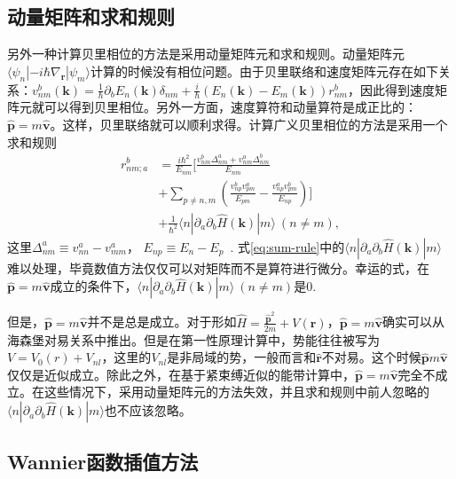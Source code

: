 \subsection{动量矩阵和求和规则}

另外一种计算贝里相位的方法是采用动量矩阵元和求和规则\cite{sipe_second-order_2000}。动量矩阵元$\langle\psi_{n}|-i\hbar\nabla_{\mathbf{r}}|\psi_{m}\rangle$计算的时候没有相位问题。由于贝里联络和速度矩阵元存在如下关系：$v_{nm}^{b}(\mathbf{k})=\frac{1}{\hbar}\partial_{b}E_{n}(\mathbf{k})\delta_{nm}+\frac{i}{\hbar}(E_{n}(\mathbf{k})-E_{m}(\mathbf{k}))r_{nm}^{b}$，因此得到速度矩阵元就可以得到贝里相位。另外一方面，速度算符和动量算符是成正比的：$\hat{\mathbf{p}}=m\hat{\mathbf{v}}$。这样，贝里联络就可以顺利求得。计算广义贝里相位的方法是采用一个求和规则
\begin{align}
r_{nm;a}^{b} & =\frac{i\hbar^{2}}{E_{nm}}[\frac{v_{nm}^{b}\Delta_{nm}^{a}+v_{nm}^{a}\Delta_{nm}^{b}}{E_{nm}}\nonumber \\
& +\sum_{p\ne n,m}(\frac{v_{np}^{b}v_{pm}^{a}}{E_{pm}}-\frac{v_{np}^{a}v_{pm}^{b}}{E_{np}})]\label{eq:sum-rule}\\ 
& +\frac{1}{\hbar^{2}}\langle n|\partial_{a}\partial_{b}\hat{H}(\mathbf{k})|m\rangle~(n\ne m)\nonumber,
\end{align}
这里$\Delta_{nm}^{a}\equiv v_{nn}^{a}-v_{mm}^{a}$， $E_{np}\equiv E_{n}-E_{p}$~\cite{cook_design_2017}.
式\ref{eq:sum-rule}中的$\langle n|\partial_{a}\partial_{b}\hat{H}(\mathbf{k})|m\rangle$难以处理，毕竟数值方法仅仅可以对矩阵而不是算符进行微分。幸运的式，在$\hat{\mathbf{p}}=m\hat{\mathbf{v}}$成立的条件下，$\langle n|\partial_{a}\partial_{b}\hat{H}(\mathbf{k})|m\rangle  \  (n\ne m)$是0.

但是，$\hat{\mathbf{p}}=m\hat{\mathbf{v}}$并不是总是成立。对于形如$\hat{H}=\frac{\hat{\mathbf{p}}^{2}}{2m}+V(\mathbf{r})$，$\hat{\mathbf{p}}=m\hat{\mathbf{v}}$确实可以从海森堡对易关系中推出。但是在第一性原理计算中，势能往往被写为 $V=V_{0}(r)+V_{nl}$，这里的$V_{nl}$是非局域的势，一般而言和$\hat{\mathbf{r}}$不对易。这个时候$\hat{\mathbf{p}} m\hat{\mathbf{v}}$仅仅是近似成立。除此之外，在基于紧束缚近似的能带计算中，$\hat{\mathbf{p}}=m\hat{\mathbf{v}}$完全不成立。在这些情况下，采用动量矩阵元的方法失效，并且求和规则中前人\cite{sipe_second-order_2000}忽略的$\langle n|\partial_{a}\partial_{b}\hat{H}(\mathbf{k})|m\rangle$也不应该忽略。


\subsection{Wannier函数插值方法}

